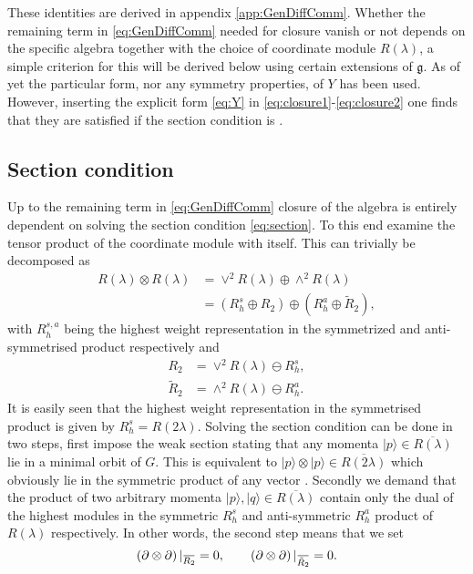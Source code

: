 These identities are derived in appendix \ref{app:GenDiffComm}. Whether the remaining term in \eqref{eq:GenDiffComm} needed for closure vanish or not depends on the specific algebra together with the choice of coordinate module $R(\lambda)$, a simple criterion for this will be derived below using certain extensions of $\mathfrak{g}$. As of yet the particular form, nor any symmetry properties, of $Y$ has been used. However, inserting the explicit form \eqref{eq:Y} in \eqref{eq:closure1}-\eqref{eq:closure2} one finds that they are satisfied if the section condition is \cite{Palmkvist2015ExpGeomSuperAlg}.

\subsection{Section condition}
Up to the remaining term in \eqref{eq:GenDiffComm} closure of the algebra is entirely dependent on solving the section condition \eqref{eq:section}. To this end examine the tensor product of the coordinate module with itself. This can trivially be decomposed as
\begin{equation}\label{eq:SectionConditionReps}
    \begin{aligned}
        R(\lambda)\otimes R(\lambda) &= \vee^2 R(\lambda)\oplus \wedge^2R(\lambda)\\
        &= \left(R_h^s\oplus R_2\right)\oplus\left(R_h^a\oplus \tilde{R}_2\right),
    \end{aligned}
\end{equation}
with $R_h^{s,a}$ being the highest weight representation in the symmetrized and anti-symmetrised product respectively and
\begin{align}
    R_2 &= \vee^2 R(\lambda)\ominus R_h^s,\\
    \tilde{R}_2 &= \wedge^2R(\lambda)\ominus  R_h^a.
\end{align}
It is easily seen that the highest weight representation in the symmetrised product is given by $R_h^s=R(2\lambda)$. Solving the section condition can be done in two steps, first impose the weak section stating that any momenta $|p\rangle\in \overbar{R(\lambda)}$ lie in a minimal orbit of $G$. This is equivalent to $|p\rangle\otimes|p\rangle \in \overbar{R(2\lambda)}$ which obviously lie in the symmetric product of any vector \cite{Berman2013,Bossard2017}. Secondly we demand that the product of two arbitrary momenta $|p\rangle,|q\rangle\in\overbar{R(\lambda)}$ contain only the dual of the highest modules in the symmetric $R^s_h$ and anti-symmetric $R^a_h$ product of $R(\lambda)$ respectively. In other words, the second step means that we set 
\begin{equation}
    \left(\pd\otimes\pd\right)|_{\overbar{R_2}} = 0, \qquad \left(\pd\otimes\pd\right)|_{\overbar{\tilde{R}_2}} =0.
\end{equation}

